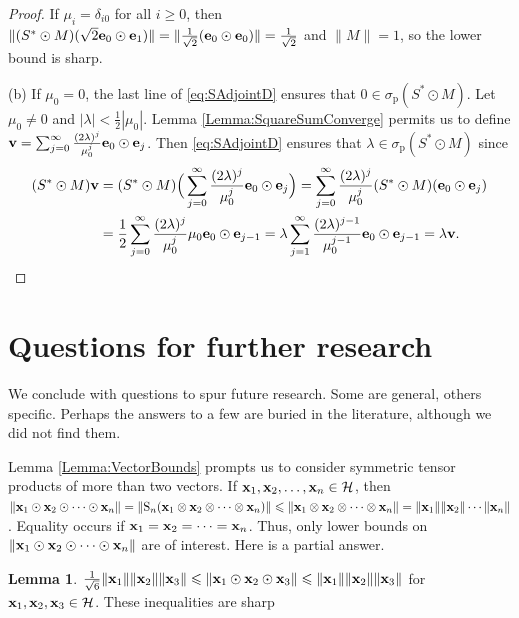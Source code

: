\documentclass[10pt,reqno]{amsart}
\newcommand{\0}{{\color{lightgray}0}}
\renewcommand{\S}{\mathrm{S}}
\renewcommand{\leq}{\leqslant}
\renewcommand{\geq}{\geqslant}
\newcommand{\norm}[1]{\| #1 \|}
\newcommand{\h}{\mathcal{H}}
\renewcommand{\vec}[1]{{\bf #1}}
\theoremstyle{definition}
\newtheorem{Lemma}[equation]{Lemma}
\numberwithin{equation}{section}
\begin{document}
\begin{proof}
If $\mu_i = \delta_{i0}$ for all $i\geq 0$, then 
$\norm{(S^* \odot M)(\sqrt{2} \vec{e}_0 \odot \vec{e}_1)}=\norm{\frac{1}{\sqrt{2}}(  \vec{e}_0 \odot \vec{e}_0 )} = \frac{1}{\sqrt{2}}$ and $\norm{M}=1$, so the lower bound is sharp.

\medskip\noindent(b) If $\mu_0 = 0$, the last line of \eqref{eq:SAdjointD} ensures that $0 \in \sigma_{\textrm{p}}(S^* \odot M)$.
Let $\mu_0 \neq 0$ and $| \lambda | < \frac{1}{2}|\mu_0|$.  
Lemma \ref{Lemma:SquareSumConverge} permits us to define
$\vec{v} = \sum_{j=0}^{\infty} \frac{(2\lambda)^j}{\mu_0^j} \vec{e}_0 \odot \vec{e}_j$.
Then \eqref{eq:SAdjointD} ensures that $\lambda \in \sigma_{\textrm{p}}(S^*\odot M)$ since
\begin{align*}
(S^* \odot M)\vec{v}
&= (S^* \odot M)\Big( \sum_{j=0}^{\infty} \frac{(2\lambda)^j}{\mu_0^j} \vec{e}_0 \odot \vec{e}_j \Big) 
=  \sum_{j=0}^{\infty} \frac{(2\lambda)^j}{\mu_0^j} (S^* \odot M) (\vec{e}_0 \odot \vec{e}_j ) \\
&=\frac{1}{2} \sum_{j=0}^{\infty} \frac{(2\lambda)^j}{\mu_0^j}  \mu_0 \vec{e}_0 \odot \vec{e}_{j-1} 
= \lambda \sum_{j=1}^{\infty} \frac{(2\lambda)^{j-1}}{\mu_0^{j-1}}   \vec{e}_0 \odot \vec{e}_{j-1} 
= \lambda \vec{v}. \qedhere
\end{align*}
\end{proof}


\section{Questions for further research}\label{Section:Questions}
We conclude with questions to spur future research.  Some are general, others specific.
Perhaps the answers to a few are buried in the literature, although we did not find them.


Lemma \ref{Lemma:VectorBounds} prompts us to consider symmetric tensor products of more than two vectors.  
If $\vec{x}_1,\vec{x}_2,\ldots, \vec{x}_n \in \h$, then 
$\norm{\vec{x}_1 \odot \vec{x}_2 \odot \cdots \odot \vec{x}_n} 
= \norm{ \S_n ( \vec{x}_1 \otimes \vec{x}_2 \otimes \cdots \otimes \vec{x}_n)}
\leq \norm{ \vec{x}_1 \otimes \vec{x}_2 \otimes \cdots \otimes \vec{x}_n }
= \norm{ \vec{x}_1} \norm{ \vec{x}_2} \cdots \norm{ \vec{x}_n}$.  Equality
occurs if $\vec{x}_1 = \vec{x}_2 = \cdots = \vec{x}_n$.  Thus, only lower bounds on 
$\norm{\vec{x}_1 \odot \vec{x}_2 \odot \cdots \odot \vec{x}_n}$ are of interest.
Here is a partial answer.

\begin{Lemma}\label{Lemma:ThreeVectors}
$\frac{1}{\sqrt{6}} \| \vec{x}_1 \| \| \vec{x}_2 \| \| \vec{x}_3 \| \leq \| \vec{x}_1 \odot \vec{x}_2 \odot \vec{x}_3 \| \leq \| \vec{x}_1 \| \| \vec{x}_2 \| \| \vec{x}_3 \|$ for $\vec{x}_1, \vec{x}_2, \vec{x}_3 \in \h$.
These inequalities are sharp
\end{Lemma}
\end{document}
